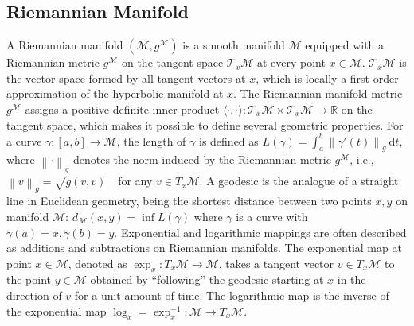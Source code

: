 \documentclass[letterpaper]{article} %
\begin{document}
\subsection{Riemannian Manifold}
A Riemannian manifold $(\mathcal{M},g^\mathcal{M})$ is a smooth manifold $\mathcal{M}$ equipped with a Riemannian metric $g^\mathcal{M}$ on the tangent space $\mathcal{T}_{x} \mathcal{M}$ at every point $x\in\mathcal{M}$. 
$\mathcal{T}_{x} \mathcal{M}$ is the vector space formed by all tangent vectors at $x$, which is locally a first-order approximation of the hyperbolic manifold at $x$. 
The Riemannian manifold metric $g^\mathcal{M}$ assigns a positive definite inner product $\langle\cdot,\cdot\rangle: \mathcal{T}_{x} \mathcal{M} \times \mathcal{T}_{x} \mathcal{M} \rightarrow \mathbb{R}$ on the tangent space, which makes it possible to define several geometric properties. 
For a curve $\gamma:[a,b]\rightarrow \mathcal{M}$, the length of $\gamma$ is defined as $ L(\gamma)=\int_a^b \left\| \gamma'(t) \right \| _g\ \mathrm{d}t, $where $\left \| \cdot \right \|_g$ denotes the norm induced by the Riemannian metric $g^\mathcal{M}$, i.e., $ \left \| v \right \| _g=\sqrt{g(v,v)}\quad$for any $ v\in T_x\mathcal{M}$. 
A geodesic is the analogue of a straight line in Euclidean geometry, being the shortest distance between two points $x,y$ on manifold $\mathcal{M}$: $d_\mathcal{M}(x,y)=\inf L(\gamma)$ where $\gamma$ is a curve with $\gamma(a)=x,\gamma(b)=y$. 
Exponential and logarithmic mappings are often described as additions and subtractions on Riemannian manifolds. 
The exponential map at point $x \in \mathcal{M}$, denoted as $\exp_x: T_x\mathcal{M}\rightarrow \mathcal{M}$, takes a tangent vector $v\in T_x\mathcal{M}$ to the point $y\in \mathcal{M}$ obtained by ``following'' the geodesic starting at $x$ in the direction of $v$ for a unit amount of time. 
The logarithmic map is the inverse of the exponential map $\log_x=\exp_x^{-1}: \mathcal{M} \rightarrow T_x\mathcal{M}$. 
\end{document}
